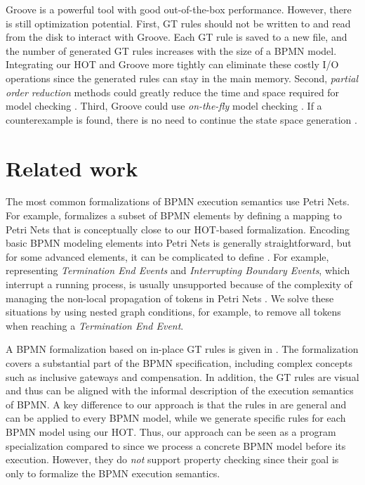 \documentclass{lmcs} %
\begin{document}
Groove is a powerful tool with good out-of-the-box performance.
However, there is still optimization potential.
First, GT rules should not be written to and read from the disk to interact with Groove.
Each GT rule is saved to a new file, and the number of generated GT rules increases with the size of a BPMN model.
Integrating our HOT and Groove more tightly can eliminate these costly I/O operations since the generated rules can stay in the main memory.
Second, \textit{partial order reduction} methods could greatly reduce the time and space required for model checking \cite{clarkeHandbookModelChecking2018}.
Third, Groove could use \textit{on-the-fly} model checking \cite{kastenbergModelCheckingDynamic2006}.
If a counterexample is found, there is no need to continue the state space generation \cite{clarkeHandbookModelChecking2018}.

\section{Related work} \label{sec:relatedWork}
The most common formalizations of BPMN execution semantics use Petri Nets.
For example, \cite{dijkmanSemanticsAnalysisBusiness2008} formalizes a subset of BPMN elements by defining a mapping to Petri Nets that is conceptually close to our HOT-based formalization.
Encoding basic BPMN modeling elements into Petri Nets is generally straightforward, but for some advanced elements, it can be complicated to define \cite{hofstedeWorkflowPatternsExpressive2002}.
For example, representing \textit{Termination End Events} and \textit{Interrupting Boundary Events}, which interrupt a running process, is usually unsupported because of the complexity of managing the non-local propagation of tokens in Petri Nets \cite{corradiniFormalApproachAnalysis2021}.
We solve these situations by using nested graph conditions, for example, to remove all tokens when reaching a \textit{Termination End Event}.
 
A BPMN formalization based on in-place GT rules is given in \cite{vangorpVisualTokenbasedFormalization2013}.
The formalization covers a substantial part of the BPMN specification, including complex concepts such as inclusive gateways and compensation.
In addition, the GT rules are visual and thus can be aligned with the informal description of the execution semantics of BPMN.
A key difference to our approach is that the rules in \cite{vangorpVisualTokenbasedFormalization2013} are general and can be applied to every BPMN model, while we generate specific rules for each BPMN model using our HOT.
Thus, our approach can be seen as a program specialization compared to \cite{vangorpVisualTokenbasedFormalization2013} since we process a concrete BPMN model before its execution.
However, they do \textit{not} support property checking since their goal is only to formalize the BPMN execution semantics.
\end{document}
